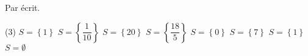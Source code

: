 \documentclass[a4paper,12pt]{report}
\begin{document}
Par écrit.
	\begin{tasks}(3)
		\task $S=\left\{1\right\}$
		\task $S=\left\{\dfrac{1}{10}\right\}$
			\task $S=\left\{20\right\}$
			\task $S=\left\{\dfrac{18}{5}\right\}$
			\task $S=\left\{0\right\}$
			\task $S=\left\{7\right\}$
			\task $S=\left\{1\right\}$
\task $S=\emptyset$
	\end{tasks}

	\begin{comment}
\begin{exo}[1]
Résoudre quatre fois de suite l'équation $\dfrac{x}{2}-3 x=\dfrac{5}{4}+x$, en utilisant la méthode proposée :
	\begin{tasks}
\task Votre manière de faire. 

(Dans les méthodes b), c) et d), simplifier au fur et à mesure l'expression obtenue.)
\task $\left[P E_2\right]$, en multipliant par 4 ; puis $\left[P E_1\right]$, en ajoutant $-4 x$; puis $\left[P E_2\right]$, en multipliant par $-\dfrac{1}{14}$.
\task $\left[P E_1\right]$, en ajoutant $-x$; puis $\left[P E_2\right]$, en multipliant par 2 ; puis $\left[P E_2\right]$, en multipliant par $-\dfrac{1}{7}$.
\task $\left[P E_1\right]$, en ajoutant $\dfrac{5}{2} x$; puis $\left[P E_1\right]$, en ajoutant $-\dfrac{5}{4} ;$ puis $\left[P E_2\right]$, en multipliant par $\dfrac{2}{7}$.
	\end{tasks}
\end{exo}

	\end{comment}
\end{document}
